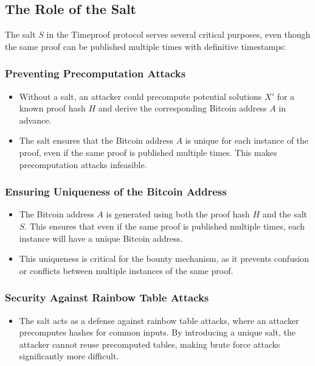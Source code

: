 \documentclass[12pt]{report}
\begin{document}
\clearpage  %

\subsection{The Role of the Salt}

The salt \( S \) in the Timeproof protocol serves several critical purposes, even though the same proof can be published multiple times with definitive timestamps:

\subsubsection{Preventing Precomputation Attacks}
\begin{itemize}
    \item Without a salt, an attacker could precompute potential solutions \( X' \) for a known proof hash \( H \) and derive the corresponding Bitcoin address \( A \) in advance.
    \item The salt ensures that the Bitcoin address \( A \) is unique for each instance of the proof, even if the same proof is published multiple times. This makes precomputation attacks infeasible.
\end{itemize}

\subsubsection{Ensuring Uniqueness of the Bitcoin Address}
\begin{itemize}
    \item The Bitcoin address \( A \) is generated using both the proof hash \( H \) and the salt \( S \). This ensures that even if the same proof is published multiple times, each instance will have a unique Bitcoin address.
    \item This uniqueness is critical for the bounty mechanism, as it prevents confusion or conflicts between multiple instances of the same proof.
\end{itemize}

\subsubsection{Security Against Rainbow Table Attacks}
\begin{itemize}
    \item The salt acts as a defense against rainbow table attacks, where an attacker precomputes hashes for common inputs. By introducing a unique salt, the attacker cannot reuse precomputed tables, making brute force attacks significantly more difficult.
\end{itemize}
\end{document}
